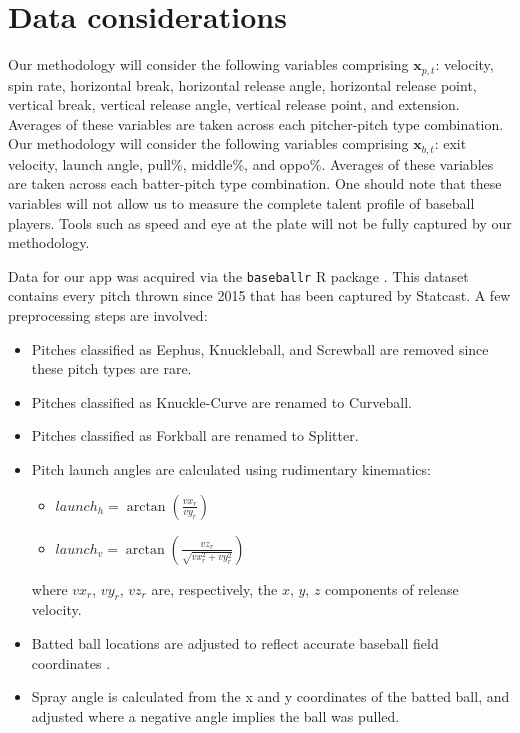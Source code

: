 \documentclass[12pt]{article}
\newcommand{\x}{\textbf{x}}
\begin{document}
\section{Data considerations}

Our methodology will consider the following variables comprising $\x_{p,t}$: velocity, spin rate, horizontal break, horizontal release angle, horizontal release point, vertical break, vertical release angle, vertical release point, and extension. Averages of these variables are taken across each pitcher-pitch type combination. Our methodology will consider the following variables comprising $\x_{b,t}$: exit velocity, launch angle, pull\%, middle\%, and oppo\%. Averages of these variables are taken across each batter-pitch type combination. One should note that these variables will not allow us to measure the complete talent profile of baseball players. %
Tools such as speed and eye at the plate will not be fully captured by our methodology.

Data for our app was acquired via the \texttt{baseballr} R package \citep{baseballr}. This dataset contains every pitch thrown since 2015 that has been captured by Statcast. A few preprocessing steps are involved:
\begin{itemize}
    \item Pitches classified as Eephus, Knuckleball, and Screwball are removed since these pitch types are rare.
    \item Pitches classified as Knuckle-Curve are renamed to Curveball.
    \item Pitches classified as Forkball are renamed to Splitter.
    \item Pitch launch angles are calculated using rudimentary kinematics:
        \begin{itemize}
            \item $launch_h = \arctan(\frac{vx_r}{vy_r})$
            \item $launch_v = \arctan\left(\frac{vz_r}{\sqrt{vx_r^2 + vy_r^2}}\right)$
        \end{itemize}
        where $vx_r$, $vy_r$, $vz_r$ are, respectively, the $x$, $y$, $z$ components of release velocity.
    \item Batted ball locations are adjusted to reflect accurate baseball field coordinates \citep{petti2017research}.
    \item Spray angle is calculated from the x and y coordinates of the batted ball, and adjusted where a negative angle implies the ball was pulled.
\end{itemize}
\end{document}
